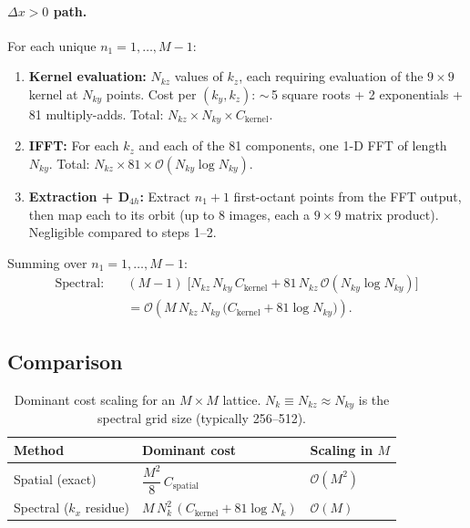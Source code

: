 \documentclass[11pt,a4paper]{article}
\newcommand{\order}[1]{\mathcal{O}\!\left(#1\right)}
\begin{document}
\paragraph{$\Delta x > 0$ path.}
For each unique $n_1 = 1, \dots, M-1$:
\begin{enumerate}
\item \textbf{Kernel evaluation:}
  $N_{kz}$ values of $k_z$, each requiring evaluation of the
  $9\times 9$ kernel at $N_{ky}$ points.
  Cost per $(k_y, k_z)$: $\sim$\,5 square roots + 2 exponentials
  + 81 multiply-adds.
  Total: $N_{kz} \times N_{ky} \times C_{\text{kernel}}$.

\item \textbf{IFFT:}
  For each $k_z$ and each of the 81 components, one 1-D FFT
  of length $N_{ky}$.
  Total: $N_{kz} \times 81 \times \order{N_{ky}\log N_{ky}}$.

\item \textbf{Extraction + D$_{4h}$:}
  Extract $n_1 + 1$ first-octant points from the FFT output,
  then map each to its orbit (up to 8 images, each a $9\times 9$
  matrix product).
  Negligible compared to steps 1--2.
\end{enumerate}

Summing over $n_1 = 1, \dots, M-1$:
\begin{equation}\label{eq:spectral_total}
\boxed{
\begin{aligned}
  \text{Spectral:}\quad
  &(M-1)\;\bigl[
    N_{kz}\,N_{ky}\,C_{\text{kernel}}
    + 81\,N_{kz}\,\order{N_{ky}\log N_{ky}}
  \bigr]\\
  &= \order{M\,N_{kz}\,N_{ky}\,\bigl(C_{\text{kernel}}
     + 81\log N_{ky}\bigr)}.
\end{aligned}
}
\end{equation}

\subsection{Comparison}\label{sec:comparison}

\begin{table}[ht]
\centering
\caption{Dominant cost scaling for an $M\times M$ lattice.
  $N_k \equiv N_{kz} \approx N_{ky}$ is the spectral
  grid size (typically 256--512).}
\label{tab:scaling}
\begin{tabular}{@{}lll@{}}
\toprule
Method & Dominant cost & Scaling in $M$ \\
\midrule
Spatial (exact) & $\dfrac{M^2}{8}\,C_{\text{spatial}}$
  & $\order{M^2}$ \\[8pt]
Spectral ($k_x$ residue) &
  $M\,N_k^2\,(C_{\text{kernel}} + 81\log N_k)$
  & $\order{M}$ \\
\bottomrule
\end{tabular}
\end{table}
\end{document}

